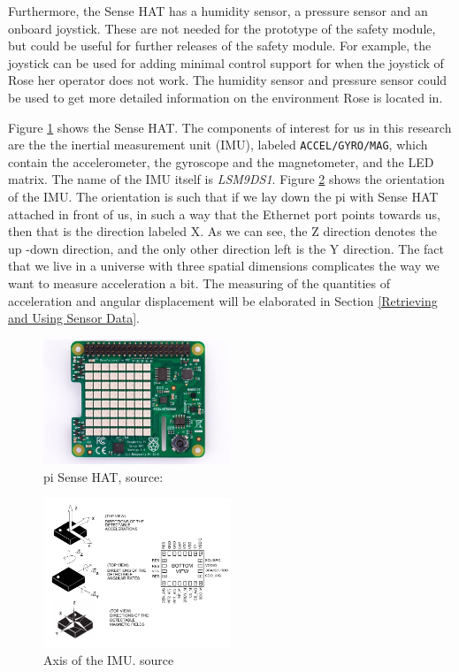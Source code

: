 \documentclass[12pt]{scrreprt}
\begin{document}
Furthermore, the Sense HAT has a humidity sensor, a  pressure sensor and an onboard joystick. These are not needed for the prototype of the safety module, but could be useful for further releases of the safety module. For example, the joystick can be used for adding minimal control support for when the joystick of Rose her operator does not work. The humidity sensor and pressure sensor could be used to get more detailed information on the environment Rose is located in.
\par
Figure \ref{fig:sensehat} shows the Sense HAT. The components of interest for us in this research are the the inertial measurement unit (IMU), labeled \texttt{ACCEL/GYRO/MAG}, which contain the accelerometer, the gyroscope and the magnetometer, and the LED matrix. The name of the IMU itself is \textit{LSM9DS1}. Figure \ref{fig:imu_orientation} shows the orientation of the IMU. The orientation is such that if we lay down the \gls{pi} with Sense HAT attached in front of us, in such a way that the Ethernet port points towards us, then that is the direction labeled X. As we can see, the Z direction denotes the up -down direction, and the only other direction left is the Y direction. The fact that we live in a universe with three spatial dimensions complicates the way we want to measure acceleration a bit. The measuring of the quantities of acceleration and angular displacement will be elaborated in Section \ref{Retrieving and Using Sensor Data}.

\begin{figure}[H]
    \centering
    \includegraphics[width=0.5\textwidth]{Figures/results/sense_hat_correct.jpg}
    \caption{\gls{pi} Sense HAT, source: \cite{sensehat}}
    \label{fig:sensehat}
\end{figure}

\begin{figure}[H]
    \centering
    \includegraphics[width=0.5\textwidth]{Figures/results/imu_orientation.png}
    \caption{Axis of the IMU. source \cite{lsm9ds1}}
    \label{fig:imu_orientation}
\end{figure}
\end{document}
